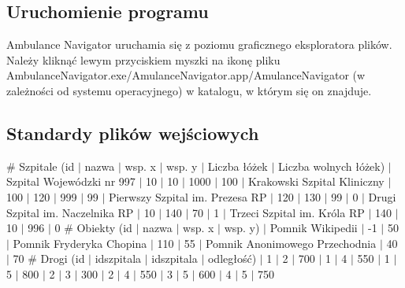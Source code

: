 \documentclass{article}
\newcommand\tab[1][1cm]{\hspace*{#1}}
\begin{document}
\subsection{Uruchomienie programu}
\tab Ambulance Navigator uruchamia się z poziomu graficznego eksploratora plików. Należy kliknąć lewym przyciskiem myszki na ikonę pliku AmbulanceNavigator.exe/AmulanceNavigator.app/AmulanceNavigator (w zależności od systemu operacyjnego) w katalogu, w którym się on znajduje.

\subsection{Standardy plików wejściowych}
\begin{tcolorbox}[title={Przykładowy plik zawierający dane szpitali, granic kraju i dróg miedzy szpitalami.}]
\# Szpitale (id $|$ nazwa $|$ wsp. x $|$ wsp. y $|$ Liczba łóżek $|$ Liczba wolnych łóżek)
 $|$ Szpital Wojewódzki nr 997 $|$ 10 $|$ 10 $|$ 1000 $|$ 100
 $|$ Krakowski Szpital Kliniczny $|$ 100 $|$ 120 $|$ 999 $|$ 99
 $|$ Pierwszy Szpital im. Prezesa RP $|$ 120 $|$ 130 $|$ 99 $|$ 0
 $|$ Drugi Szpital im. Naczelnika RP $|$ 10 $|$ 140 $|$ 70 $|$ 1
 $|$ Trzeci Szpital im. Króla RP $|$ 140 $|$ 10 $|$ 996 $|$ 0
\newline 	
\newline \# Obiekty (id $|$ nazwa $|$ wsp. x $|$ wsp. y)
 $|$ Pomnik Wikipedii $|$ -1 $|$ 50
 $|$ Pomnik Fryderyka Chopina $|$ 110 $|$ 55
 $|$ Pomnik Anonimowego Przechodnia $|$ 40 $|$ 70
\newline 
\newline \# Drogi (id $|$ id\textunderscore szpitala $|$ id\textunderscore szpitala $|$ odległość)
 $|$ 1 $|$ 2 $|$ 700
 $|$ 1 $|$ 4 $|$ 550
 $|$ 1 $|$ 5 $|$ 800
 $|$ 2 $|$ 3 $|$ 300
 $|$ 2 $|$ 4 $|$ 550
 $|$ 3 $|$ 5 $|$ 600
 $|$ 4 $|$ 5 $|$ 750
\end{tcolorbox}
\end{document}
